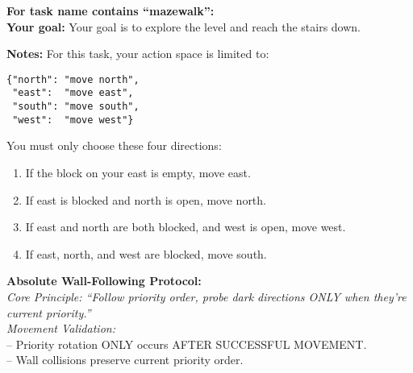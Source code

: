\begin{MyGreenBox}[frametitle={\textbf{Iteration 2 MiniHack Prompt}}]
{%
\textbf{For task name contains “mazewalk”:}\\
\textbf{Your goal:} Your goal is to explore the level and reach the stairs down.

\textbf{Notes:}  
For this task, your action space is limited to:
\begin{verbatim}
{"north": "move north",
 "east":  "move east",
 "south": "move south",
 "west":  "move west"}
\end{verbatim}

You must only choose these four directions:

\begin{enumerate}
  \item If the block on your east is empty, move east.
  \item If east is blocked and north is open, move north.
  \item If east and north are both blocked, and west is open, move west.
  \item If east, north, and west are blocked, move south.
\end{enumerate}

\textbf{Absolute Wall-Following Protocol:}\\
\textit{Core Principle: “Follow priority order, probe dark directions ONLY when they're current priority.”}\\
\textit{Movement Validation:}\\
– Priority rotation ONLY occurs AFTER SUCCESSFUL MOVEMENT.\\
– Wall collisions preserve current priority order.

}
\end{MyGreenBox}
